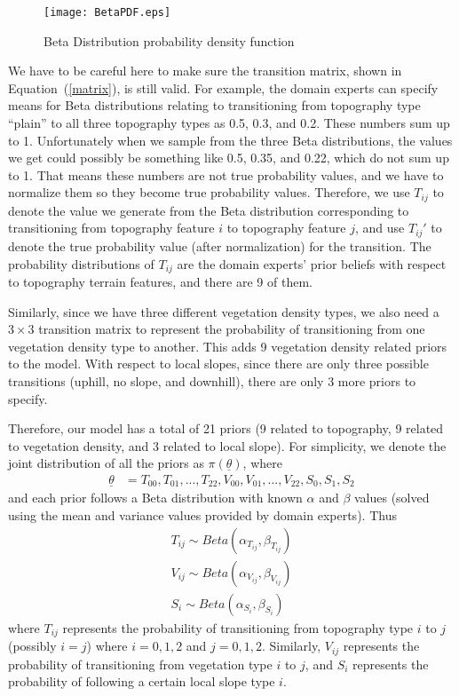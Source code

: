 \begin{figure}
\centering
\texttt{[image: BetaPDF.eps]}
\caption[Beta Distribution probability density function]{Beta Distribution probability density function}
\label{BetaPDF}
\end{figure}

We have to be careful here to make sure the transition matrix, shown in Equation~(\ref{matrix}), is still valid. For example, the domain experts can specify means for Beta distributions relating to transitioning from topography type ``plain'' to all three topography types as 0.5, 0.3, and 0.2. These numbers sum up to 1. Unfortunately when we sample from the three Beta distributions, the values we get could possibly be something like 0.5, 0.35, and 0.22, which do not sum up to 1. That means these numbers are not true probability values, and we have to normalize them so they become true probability values. Therefore, we use $T_{ij}$ to denote the value we generate from the Beta distribution corresponding to transitioning from topography feature $i$ to topography feature $j$, and use $T_{ij}'$ to denote the true probability value (after normalization) for the transition. The probability distributions of $T_{ij}$ are the domain experts' prior beliefs with respect to topography terrain features, and there are 9 of them.

Similarly, since we have three different vegetation density types, we also need a $3 \times 3$ transition matrix to represent the probability of transitioning from one vegetation density type to another. This adds 9 vegetation density related priors to the model. With respect to local slopes, since there are only three possible transitions (uphill, no slope, and downhill), there are only 3 more priors to specify.

Therefore, our model has a total of 21 priors (9 related to topography, 9 related to vegetation density, and 3 related to local slope). For simplicity, we denote the joint distribution of all the priors as $\pi(\underline{\theta})$, where 
\begin{align}
\label{21}
\underline{\theta} &=T_{00},T_{01},...,T_{22},V_{00},V_{01},...,V_{22},S_0,S_1,S_2
\end{align}
and each prior follows a Beta distribution with known $\alpha$ and $\beta$ values (solved using the mean and variance values provided by domain experts). Thus
\begin{align}
\label{BetaT}
T_{ij} \sim Beta(\alpha_{T_{ij}}, \beta_{T_{ij}})\\
\label{BetaV}
V_{ij} \sim Beta(\alpha_{V_{ij}}, \beta_{V_{ij}})\\
\label{BetaS}
S_{i} \sim Beta(\alpha_{S_{i}}, \beta_{S_{i}})
\end{align}
where $T_{ij}$ represents the probability of transitioning from topography type $i$ to $j$ (possibly $i=j$) where $i=0,1,2$ and $j=0,1,2$. Similarly, $V_{ij}$ represents the probability of transitioning from vegetation type $i$ to $j$, and $S_{i}$ represents the probability of following a certain local slope type $i$.

